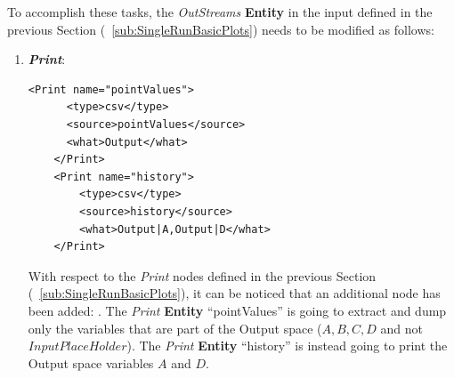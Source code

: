 To accomplish these tasks, the \textit{OutStreams} \textbf{Entity} in the input defined in the previous Section (~\ref{sub:SingleRunBasicPlots}) needs to be modified as follows:
\begin{enumerate}
   \item \textbf{\textit{Print}}:
   \begin{lstlisting}[style=XML,morekeywords={arg,extension,pauseAtEnd,overwrite}]
    <Print name="pointValues">
      <type>csv</type>
      <source>pointValues</source>
      <what>Output</what>
    </Print>
    <Print name="history">
        <type>csv</type>
        <source>history</source>
        <what>Output|A,Output|D</what>
    </Print>
   \end{lstlisting}   
   With respect to the \textit{Print} nodes defined in the previous Section (~\ref{sub:SingleRunBasicPlots}), it can
   be noticed that an additional node has been added: . The \textit{Print} \textbf{Entity}  
   ``pointValues'' is going to extract and dump only the variables that are part of the Output space 
   ($A,B,C,D$ and not $InputPlaceHolder$).  The \textit{Print} \textbf{Entity} ``history'' is instead going to print 
   the Output space variables $A$ and $D$. 


\end{enumerate}
